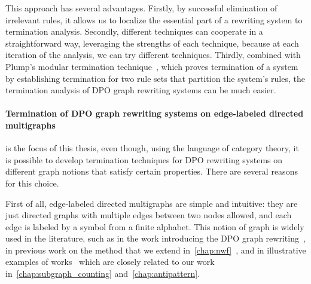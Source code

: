   
  This approach has several advantages.
  Firstly, by successful elimination of irrelevant rules, it allows us to localize the essential part of a rewriting system to termination analysis.
  Secondly, different techniques can cooperate in a straightforward way, leveraging the strengths of each technique, because at each iteration of the analysis, we can try different techniques.
   Thirdly, combined with Plump's modular termination technique~\cite{plump2018modular}, which proves termination of a system by establishing termination for two rule sets that partition the system's rules, the termination analysis of DPO graph rewriting systems can be much easier.

\paragraph{Termination of DPO graph rewriting systems on edge-labeled directed multigraphs} is the focus of this thesis, even though, using the language of category theory, it is possible to develop termination techniques for DPO rewriting systems on different graph notions that satisfy certain properties. There are several reasons for this choice.

First of all, edge-labeled directed multigraphs are simple and intuitive: they are just directed graphs with multiple edges between two nodes allowed, and each edge is labeled by a symbol from a finite alphabet. This notion of graph is widely used in the literature, such as in the work introducing the DPO graph rewriting~\cite{ehrig1973graph}, in previous work on the method that we extend in~\autoref{chap:nwf}~\cite{bruggink2014termination,bruggink2015proving,zantema2014termination}, and in illustrative examples of works~\cite{overbeek2024termination_lmcs,endrullis2024generalized_icgt} which are closely related to our work in~\autoref{chap:subgraph_counting} and~\autoref{chap:antipattern}.

